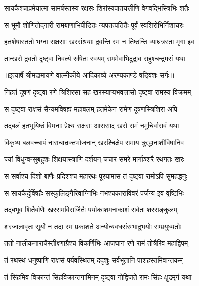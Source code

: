 \twolineshloka
{सायकैश्चाप्रमेयात्मा सामर्षस्तस्य रक्षसः}
{शिरांस्यपातयत्त्रीणि वेगवद्भिस्त्रिभिः शतैः} %

\twolineshloka
{स भूमौ शोणितोद्गारी रामबाणाभिपीडितः}
{न्यपतत्पतितैः पूर्वं स्वशिरोभिर्निशाचरः} %

\twolineshloka
{हतशेषास्ततो भग्ना राक्षसाः खरसंश्रयाः}
{द्रवन्ति स्म न तिष्ठन्ति व्याघ्रत्रस्ता मृगा इव} %

\twolineshloka
{तान्खरो द्रवतो दृष्ट्वा निवर्त्य रुषितः स्वयम्}
{राममेवाभिदुद्राव राहुश्चन्द्रमसं यथा} %


{॥इत्यार्षे श्रीमद्रामायणे वाल्मीकीये आदिकाव्ये अरण्यकाण्डे षड्विंशः सर्गः॥}


\twolineshloka
{निहतं दूषणं दृष्ट्वा रणे त्रिशिरसा सह}
{खरस्याप्यभवत्त्रासो दृष्ट्वा रामस्य विक्रमम्} %

\twolineshloka
{स दृष्ट्वा राक्षसं सैन्यमविषह्यं महाबलम्}
{हतमेकेन रामेण दूषणस्त्रिशिरा अपि} %

\twolineshloka
{तद्बलं हतभूयिष्ठं विमनाः प्रेक्ष्य राक्षसः}
{आससाद खरो रामं नमुचिर्वासवं यथा} %

\twolineshloka
{विकृष्य बलवच्चापं नाराचान्रक्तभोजनान्}
{खरश्चिक्षेप रामाय क्रुद्धानाशीविषानिव} %

\twolineshloka
{ज्यां विधुन्वन्सुबहुशः शिक्षयास्त्राणि दर्शयन्}
{चचार समरे मार्गाञ्शरै रथगतः खरः} %

\twolineshloka
{स सर्वाश्च दिशो बाणैः प्रदिशश्च महारथः}
{पूरयामास तं दृष्ट्वा रामोऽपि सुमहद्धनुः} %

\twolineshloka
{स सायकैर्दुर्विषहैः सस्फुलिङ्गैरिवाग्निभिः}
{नभश्चकाराविवरं पर्जन्य इव वृष्टिभिः} %

\twolineshloka
{तद्बभूव शितैर्बाणैः खररामविसर्जितैः}
{पर्याकाशमनाकाशं सर्वतः शरसङ्कुलम्} %

\twolineshloka
{शरजालावृतः सूर्यो न तदा स्म प्रकाशते}
{अन्योन्यवधसंरम्भादुभयोः सम्प्रयुध्यतोः} %

\twolineshloka
{ततो नालीकनाराचैस्तीक्ष्णाग्रैश्च विकर्णिभिः}
{आजघान रणे रामं तोत्रैरिव महाद्विपम्} %

\twolineshloka
{तं रथस्थं धनुष्पाणिं राक्षसं पर्यवस्थितम्}
{ददृशुः सर्वभूतानि पाशहस्तमिवान्तकम्} %

\twolineshloka
{तं सिंहमिव विक्रान्तं सिंहविक्रान्तगामिनम्}
{दृष्ट्वा नोद्विजते रामः सिंहः क्षुद्रमृगं यथा} %

